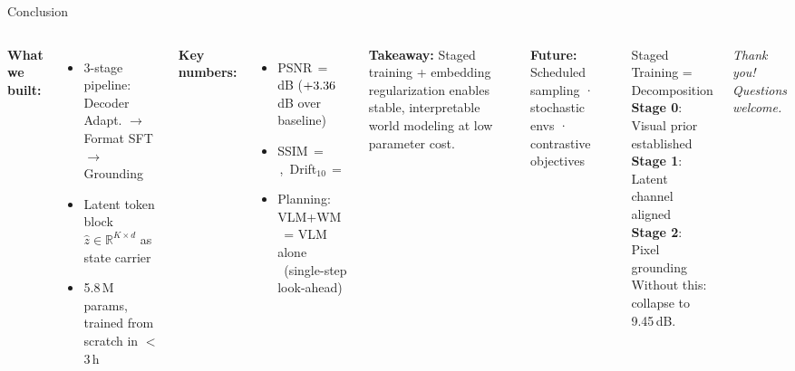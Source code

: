 \documentclass[aspectratio=169,10pt]{beamer}
\begin{document}
\begin{frame}{Conclusion}

\begin{columns}[T]

\textbf{What we built:}
\begin{itemize}\setlength{\itemsep}{1pt}
  \item 3-stage pipeline: Decoder Adapt. $\to$ Format SFT $\to$ Grounding
  \item Latent token block $\hat{z} \in \mathbb{R}^{K\times d}$ as state carrier
  \item 5.8\,M params, trained from scratch in $<$3\,h
\end{itemize}

\vspace{3pt}
\textbf{Key numbers:}
\begin{itemize}\setlength{\itemsep}{1pt}
  \item PSNR\,$=$\,\MAINPSNR\,dB ($+3.36$\,dB over baseline)
  \item SSIM\,$=$\,\MAINSSIM,\ Drift$_{10}$\,$=$\,\MAINDRIFTX
  \item Planning: VLM+WM \PLANVLMWMSR\ = VLM alone \PLANVLMSR\ (single-step look-ahead)
\end{itemize}

\vspace{3pt}
\textbf{Takeaway:} Staged training + embedding regularization enables stable, interpretable world modeling at low parameter cost.

\vspace{3pt}
{\small\textbf{Future:} Scheduled sampling · stochastic envs · contrastive objectives}

\vspace{4pt}
\begin{block}{Staged Training = Decomposition}
\footnotesize
\textbf{Stage 0}: Visual prior established\\
\textbf{Stage 1}: Latent channel aligned\\
\textbf{Stage 2}: Pixel grounding\\[2pt]
Without this: collapse to 9.45\,dB.
\end{block}

\vspace{8pt}
{\small\textit{Thank you! Questions welcome.}}
\end{columns}

\end{frame}
\end{document}
